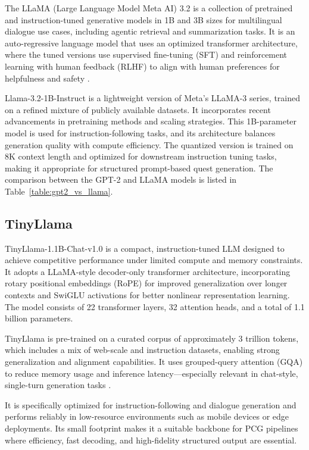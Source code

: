 The LLaMA (Large Language Model Meta AI) 3.2 is a collection of pretrained and
instruction-tuned generative models in 1B and 3B sizes for multilingual dialogue use
cases, including agentic retrieval and summarization tasks. It is an auto-regressive language
model that uses an optimized transformer architecture, where the tuned versions use
supervised fine-tuning (SFT) and reinforcement learning with human feedback (RLHF)
to align with human preferences for helpfulness and safety \cite{dao2023flashattention2,touvron2023llama}.

Llama-3.2-1B-Instruct \cite{llama32} is a lightweight version of Meta's LLaMA-3 series, trained on
a refined mixture of publicly available datasets. It incorporates recent advancements
in pretraining methods and scaling strategies. This 1B-parameter model is used for
instruction-following tasks, and its architecture balances generation quality with compute
efficiency. The quantized version is trained on 8K context length and optimized for
downstream instruction tuning tasks, making it appropriate for structured prompt-based
quest generation. The comparison between the GPT-2 and LLaMA models is listed in
Table~\ref{table:gpt2_vs_llama}.

\subsection{TinyLlama}

TinyLlama-1.1B-Chat-v1.0 is a compact, instruction-tuned LLM designed to achieve competitive
performance under limited compute and memory constraints. It adopts a LLaMA-style
decoder-only transformer architecture, incorporating rotary positional embeddings
(RoPE) for improved generalization over longer contexts and SwiGLU activations for
better nonlinear representation learning. The model consists of 22 transformer layers, 32
attention heads, and a total of 1.1 billion parameters.

TinyLlama \cite{tinyllama,zhang2024tinyllama} is pre-trained on a curated corpus of approximately 3 trillion tokens, which
includes a mix of web-scale and instruction datasets, enabling strong generalization and
alignment capabilities. It uses grouped-query attention (GQA) to reduce memory usage
and inference latency—especially relevant in chat-style, single-turn generation tasks \cite{lit-gpt,dao2023flashattention2}.

It is specifically optimized for instruction-following and dialogue generation and performs
reliably in low-resource environments such as mobile devices or edge deployments.
Its small footprint makes it a suitable backbone for PCG pipelines where efficiency, fast
decoding, and high-fidelity structured output are essential.

